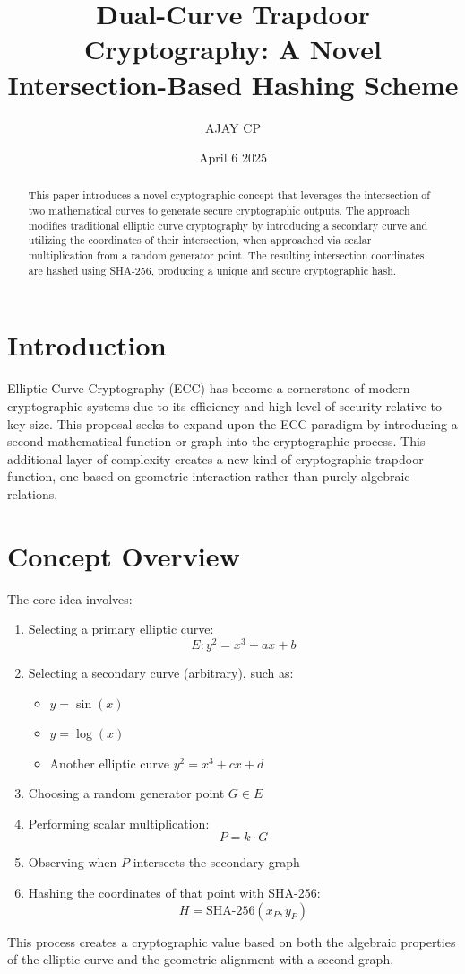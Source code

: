 \documentclass{article}
\title{Dual-Curve Trapdoor Cryptography: A Novel Intersection-Based Hashing Scheme}
\author{AJAY CP}
\date{April 6 2025}
\begin{document}
\maketitle

\begin{abstract}
This paper introduces a novel cryptographic concept that leverages the intersection of two mathematical curves to generate secure cryptographic outputs. The approach modifies traditional elliptic curve cryptography by introducing a secondary curve and utilizing the coordinates of their intersection, when approached via scalar multiplication from a random generator point. The resulting intersection coordinates are hashed using SHA-256, producing a unique and secure cryptographic hash.
\end{abstract}

\section{Introduction}
Elliptic Curve Cryptography (ECC) has become a cornerstone of modern cryptographic systems due to its efficiency and high level of security relative to key size. This proposal seeks to expand upon the ECC paradigm by introducing a second mathematical function or graph into the cryptographic process. This additional layer of complexity creates a new kind of cryptographic trapdoor function, one based on geometric interaction rather than purely algebraic relations.

\section{Concept Overview}
The core idea involves:
\begin{enumerate}
  \item Selecting a primary elliptic curve:
  \[ E: y^2 = x^3 + ax + b \]
  \item Selecting a secondary curve (arbitrary), such as:
  \begin{itemize}
    \item \( y = \sin(x) \)
    \item \( y = \log(x) \)
    \item Another elliptic curve \( y^2 = x^3 + cx + d \)
  \end{itemize}
  \item Choosing a random generator point \( G \in E \)
  \item Performing scalar multiplication:
  \[ P = k \cdot G \]
  \item Observing when \( P \) intersects the secondary graph
  \item Hashing the coordinates of that point with SHA-256:
  \[ H = \text{SHA-256}(x_P, y_P) \]
\end{enumerate}
This process creates a cryptographic value based on both the algebraic properties of the elliptic curve and the geometric alignment with a second graph.
\end{document}
